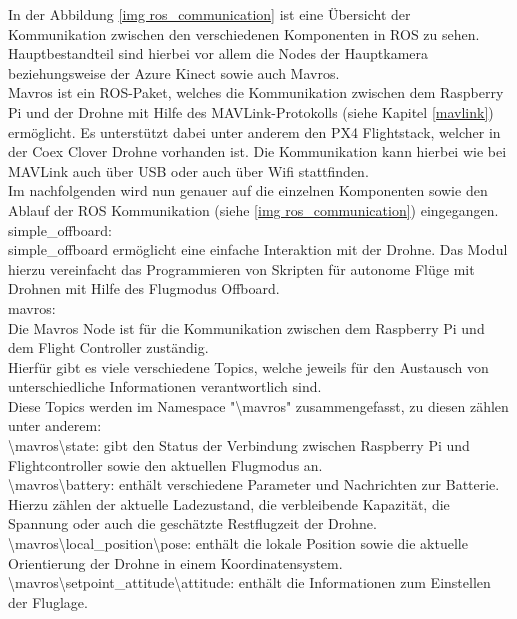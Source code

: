 In der Abbildung \ref{img ros_communication} ist eine Übersicht der Kommunikation zwischen den verschiedenen Komponenten in \ac{ROS} zu sehen. \\
Hauptbestandteil sind hierbei vor allem die Nodes der Hauptkamera beziehungsweise der Azure Kinect sowie auch Mavros. \\
Mavros ist ein ROS-Paket, welches die Kommunikation zwischen dem Raspberry Pi und der Drohne mit Hilfe des MAVLink-Protokolls (siehe Kapitel \ref{mavlink}) ermöglicht. Es unterstützt dabei unter anderem den PX4 Flightstack, welcher in der Coex Clover Drohne vorhanden ist. Die Kommunikation kann hierbei wie bei MAVLink auch über \ac{USB} oder auch über Wifi stattfinden. \cite[vgl.][]{mavros}\\
Im nachfolgenden wird nun genauer auf die einzelnen Komponenten sowie den Ablauf der ROS Kommunikation (siehe \ref{img ros_communication}) eingegangen. \\

simple\_offboard: \\
simple\_offboard ermöglicht eine einfache Interaktion mit der Drohne. Das Modul hierzu vereinfacht das Programmieren von Skripten für autonome Flüge mit Drohnen mit Hilfe des Flugmodus Offboard. \cite[vgl.][]{simple_offboard}\\

mavros: \\
Die Mavros Node ist für die Kommunikation zwischen dem Raspberry Pi und dem Flight Controller zuständig.\\
Hierfür gibt es viele verschiedene Topics, welche jeweils für den Austausch von unterschiedliche Informationen verantwortlich sind.\\
Diese Topics werden im Namespace "\textbackslash mavros" zusammengefasst, zu diesen zählen unter anderem:\\
\textbackslash mavros\textbackslash state: gibt den Status der Verbindung zwischen Raspberry Pi und Flightcontroller sowie den aktuellen Flugmodus an.\\
\textbackslash mavros\textbackslash battery: enthält verschiedene Parameter und Nachrichten zur Batterie. Hierzu zählen der aktuelle Ladezustand, die verbleibende Kapazität, die Spannung oder auch die geschätzte Restflugzeit der Drohne.\\
\textbackslash mavros\textbackslash local\_position\textbackslash pose: enthält die lokale Position sowie die aktuelle Orientierung der Drohne in einem Koordinatensystem.\\
\textbackslash mavros\textbackslash setpoint\_attitude\textbackslash attitude: enthält die Informationen zum Einstellen der Fluglage. \cite[vgl.][]{mavros}\\
 
